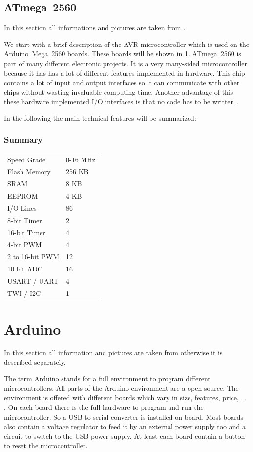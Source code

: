 \subsection{ATmega~2560} \label{sec:atmega2560}
In this section all informations and pictures are taken from \cite{manual:atmega2560}.

We start with a brief description of the AVR microcontroller which is used on the Arduino~Mega~2560 boards.
These boards will be shown in \ref{sec:arduino}.
ATmega~2560 is part of many different electronic projects.
It is a very many-sided microcontroller because it has has a lot of different features implemented in hardware.
This chip contains a lot of input and output interfaces so it can communicate with other chips without wasting invaluable computing time.
Another advantage of this these hardware implemented I/O interfaces is that no code has to be written .

In the following the main technical features will be summarized:
\subsubsection{Summary} \label{sec:atmega2560Summary}
\begin{tabular}{ll}
Speed Grade	& 0-16 MHz	\\
Flash Memory	& 256 KB	\\
SRAM			& 8 KB	\\
EEPROM		& 4 KB	\\
I/O Lines		& 86		\\
8-bit Timer		& 2		\\
16-bit Timer	& 4		\\
4-bit PWM		& 4		\\
2 to 16-bit PWM	& 12		\\
10-bit ADC		& 16		\\
USART / UART	& 4		\\
TWI / I2C		& 1		\\
\end{tabular}


\section{Arduino} \label {sec:arduino}
In this section all information and pictures are taken from \cite{web:arduino} otherwise it is described separately.

The term Arduino stands for a full environment to program different microcontrollers.
All parts of the Arduino environment are a open source. 
The environment is offered with different boards which vary in size, features, price, ... .
On each board there is the full hardware to program and run the microcontroller.
So a USB to serial converter is installed on-board.
Most boards also contain a voltage regulator to feed it by an external power supply too and a circuit to switch to the USB power supply.
At least each board contain a button to reset the microcontroller.


